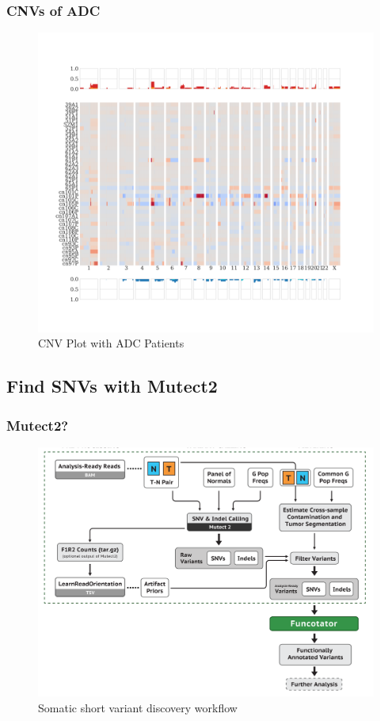 \documentclass{beamer}
\begin{document}
    \begin{frame}
        \frametitle{CNVs of ADC}

        \begin{figure}
            \includegraphics[height=0.7 \textheight]{figures/Sequenza/BWA-genome-ADC.pdf}
            \caption{CNV Plot with ADC Patients}
        \end{figure}
    \end{frame}

    \subsection{Find SNVs with Mutect2}
    \begin{frame}
        \frametitle{Mutect2?}

        \begin{figure}
            \includegraphics[width=0.6 \linewidth]{figures/Workflow/somatic_short_variants.png}
            \caption{Somatic short variant discovery workflow \protect\cite{gatk1, gatk2}}
        \end{figure}
    \end{frame}
\end{document}
